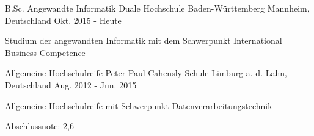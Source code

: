 

\begin{cventries}

  \cventry
    {B.Sc. Angewandte Informatik} %
    {Duale Hochschule Baden-Württemberg} %
    {Mannheim, Deutschland} %
    {Okt. 2015 - Heute} %
    {
      \begin{cvitems} %
        \item {Studium der angewandten Informatik mit dem Schwerpunkt International Business Competence}
      \end{cvitems}
    }
    
  \cventry
    {Allgemeine Hochschulreife} %
    {Peter-Paul-Cahensly Schule} %
    {Limburg a. d. Lahn, Deutschland} %
    {Aug. 2012 - Jun. 2015} %
    {
      \begin{cvitems} %
        \item {Allgemeine Hochschulreife mit Schwerpunkt Datenverarbeitungstechnik}
        \item {Abschlussnote: 2,6}
      \end{cvitems}
    }
    

\end{cventries}
